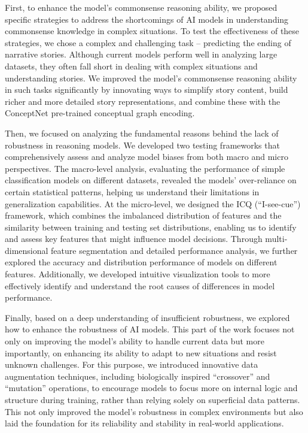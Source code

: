 \documentclass[UTF8,a4paper,12pt]{ctexart}
\numberwithin{equation}{section}
\begin{document}
First, to enhance the model's commonsense reasoning ability, we proposed specific strategies to address the shortcomings of AI models in understanding commonsense knowledge in complex situations. To test the effectiveness of these strategies, we chose a complex and challenging task – predicting the ending of narrative stories. Although current models perform well in analyzing large datasets, they often fall short in dealing with complex situations and understanding stories. We improved the model's commonsense reasoning ability in such tasks significantly by innovating ways to simplify story content, build richer and more detailed story representations, and combine these with the ConceptNet pre-trained conceptual graph encoding.

Then, we focused on analyzing the fundamental reasons behind the lack of robustness in reasoning models. We developed two testing frameworks that comprehensively assess and analyze model biases from both macro and micro perspectives. The macro-level analysis, evaluating the performance of simple classification models on different datasets, revealed the models' over-reliance on certain statistical patterns, helping us understand their limitations in generalization capabilities. At the micro-level, we designed the ICQ (``I-see-cue'') framework, which combines the imbalanced distribution of features and the similarity between training and testing set distributions, enabling us to identify and assess key features that might influence model decisions. Through multi-dimensional feature segmentation and detailed performance analysis, we further explored the accuracy and distribution performance of models on different features. Additionally, we developed intuitive visualization tools to more effectively identify and understand the root causes of differences in model performance.

Finally, based on a deep understanding of insufficient robustness, we explored how to enhance the robustness of AI models. This part of the work focuses not only on improving the model's ability to handle current data but more importantly, on enhancing its ability to adapt to new situations and resist unknown challenges. For this purpose, we introduced innovative data augmentation techniques, including biologically inspired ``crossover'' and ``mutation'' operations, to encourage models to focus more on internal logic and structure during training, rather than relying solely on superficial data patterns. This not only improved the model's robustness in complex environments but also laid the foundation for its reliability and stability in real-world applications.
\end{document}
